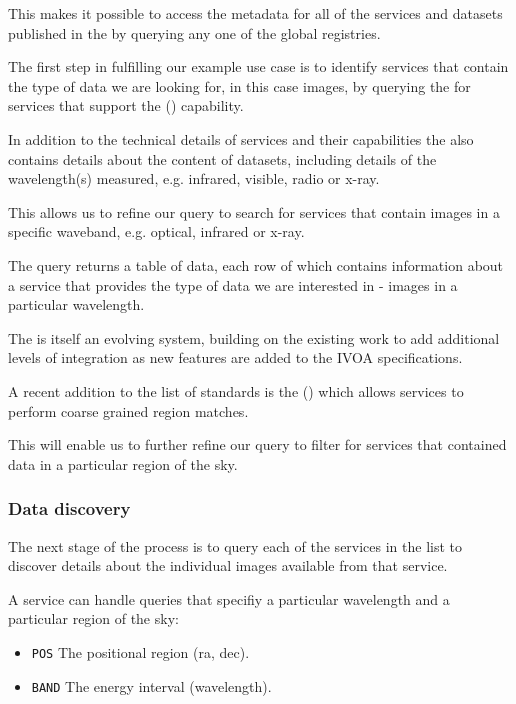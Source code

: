 \documentclass{article}
\begin{document}
This makes it possible to access the metadata for all of the services
and datasets published in the \cite{vo} by querying any one of the global
registries.

The first step in fulfilling our example use case is to identify services that
contain the type of data we are looking for, in this case images, by querying
the \cite{ivoa-reg} for services that support the 
(\cite{ivoa-sia}) capability.

In addition to the technical details of services and their capabilities
the \cite{ivoa-reg} also contains details about the content of datasets,
including details of the wavelength(s) measured, e.g. infrared, visible,
radio or x-ray.

This allows us to refine our query to search for \cite{ivoa-sia} services
that contain images in a specific waveband, e.g. optical, infrared or x-ray.

The \cite{ivoa-reg} query returns a table of data, each row of which contains
information about a \cite{ivoa-sia} service that provides the type of data
we are interested in - images in a particular wavelength.

The \cite{vo} is itself an evolving system, building on the existing work
to add additional levels of integration as new features are added to the
IVOA specifications.

A recent addition to the list of \cite{ivoa} standards is the
 (\cite{ivoa-moc}) which allows \cite{ivoa-reg}
services to perform coarse grained region matches.

This will enable us to further refine our \cite{ivoa-reg} query to filter
for \cite{ivoa-sia} services that contained data in a particular region of
the sky.

\subsubsection{Data discovery}

The next stage of the process is to query each of the \cite{ivoa-sia}
services in the list to discover details about the individual images
available from that service.

\noindent
A \cite{ivoa-sia} service can handle queries that specifiy a particular
wavelength and a particular region of the sky:
\begin{itemize}
  \item \texttt{POS}  The positional region (ra, dec).
  \item \texttt{BAND} The energy interval (wavelength).
\end{itemize}
\end{document}
